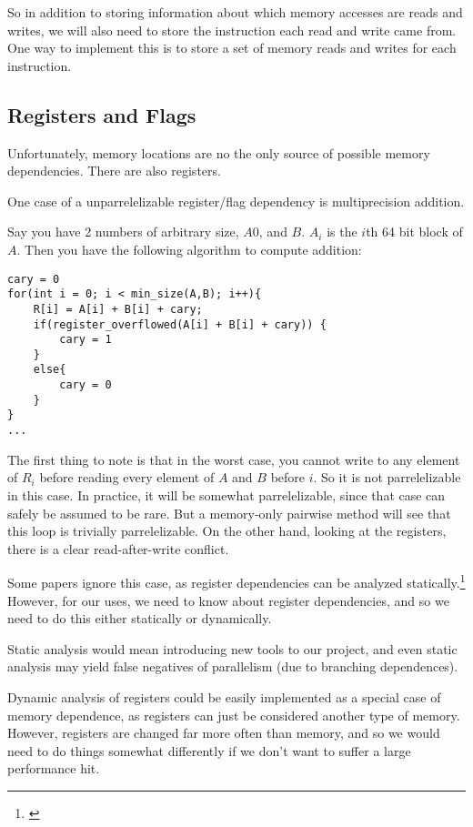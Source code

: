 \documentclass[12pt,twoside]{reedthesis}
\begin{document}
		So in addition to storing information about which memory accesses are reads and writes, we will also need to store the instruction each read and write came from. One way to implement this is to store a set of memory reads and writes for each instruction. 
		
		\subsection{Registers and Flags}
		Unfortunately, memory locations are no the only source of possible memory dependencies. There are also registers.
		
		
		One case of a unparrelelizable register/flag dependency is multiprecision addition.
		
		Say you have 2 numbers of arbitrary size, $A0$, and $B$. $A_i$ is the $i$th 64 bit block of $A$. Then you have the following algorithm to compute addition:
		
		\begin{lstlisting}
cary = 0
for(int i = 0; i < min_size(A,B); i++){
	R[i] = A[i] + B[i] + cary;
	if(register_overflowed(A[i] + B[i] + cary)) {
		cary = 1
	}
	else{
		cary = 0
	}
}
...
		\end{lstlisting}
		
		The first thing to note is that in the worst case, you cannot write to any element of $R_i$ before reading every element of $A$ and $B$ before $i$. So it is not parrelelizable in this case. In practice, it will be somewhat parrelelizable, since that case can safely be assumed to be rare. But a memory-only pairwise method will see that this loop is trivially parrelelizable. On the other hand, looking at the registers, there is a clear read-after-write conflict. 
		
		Some papers ignore this case, as register dependencies can be analyzed statically.\footnote{\cite{Chen:2004}} However, for our uses, we need to know about register dependencies, and so we need to do this either statically or dynamically. 
		
		Static analysis would mean introducing new tools to our project, and even static analysis may yield false negatives of parallelism (due to branching dependences). 
		
		Dynamic analysis of registers could be easily implemented as a special case of memory dependence, as registers can just be considered another type of memory. However, registers are changed far more often than memory, and so we would need to do things somewhat differently if we don't want to suffer a large performance hit. 
		
\end{document}
